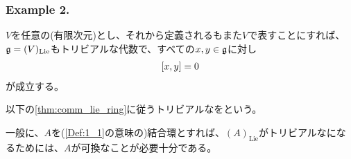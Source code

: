 \documentclass[fleqn,twocolumn,titlepage,dvipdfmx]{jsarticle}
\begin{document}
\subsubsection*{Example 2.}\label{ex:2}
\begin{remark}
  $V$を任意の(有限次元)とし、それから定義されるもまた$V$で表すことにすれば、$\mathfrak{g}=(V)_\mathrm{Lie}$もトリビアルな代数で、すべての$x,y\in\mathfrak{g}$に対し
  \begin{align*}
    \comm{x}{y}=0
  \end{align*}が成立する。
\end{remark}
\begin{named}
  以下の\cref{thm:comm_lie_ring}に従うトリビアルな{}をという。
\end{named}
\begin{theorem}[可換なリー環]\label{thm:comm_lie_ring}
  一般に、$A$を(\cref{Def:1_1}の意味の)結合環とすれば、$(A)_\mathrm{Lie}$がトリビアルな{}になるためには、$A$が可換なことが必要十分である。
\end{theorem}
\end{document}
